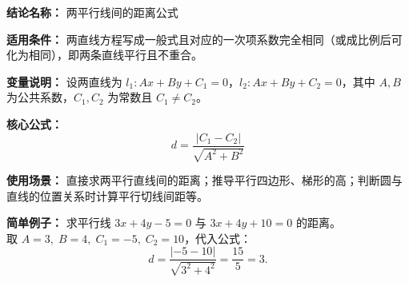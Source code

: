 \textbf{结论名称：} 两平行线间的距离公式

\textbf{适用条件：} 两直线方程写成一般式且对应的一次项系数完全相同（或成比例后可化为相同），即两条直线平行且不重合。

\textbf{变量说明：} 设两直线为 \(l_1: Ax+By+C_1=0\)，\(l_2: Ax+By+C_2=0\)，其中 \(A,B\) 为公共系数，\(C_1,C_2\) 为常数且 \(C_1\neq C_2\)。

\textbf{核心公式：}
\[
\boxed{d = \frac{|C_1 - C_2|}{\sqrt{A^{2}+B^{2}}}}
\]

\textbf{使用场景：} 直接求两平行直线间的距离；推导平行四边形、梯形的高；判断圆与直线的位置关系时计算平行切线间距等。

\textbf{简单例子：} 求平行线 \(3x+4y-5=0\) 与 \(3x+4y+10=0\) 的距离。\\
取 \(A=3,\;B=4,\;C_1=-5,\;C_2=10\)，代入公式：
\[
d = \frac{|-5-10|}{\sqrt{3^2+4^2}} = \frac{15}{5}=3.
\]